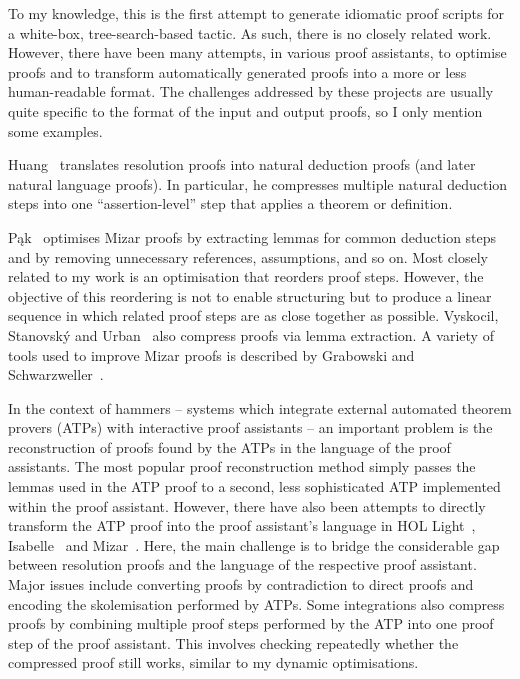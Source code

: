 \documentclass[sigplan,10pt,anonymous,review]{acmart}
\begin{document}
To my knowledge, this is the first attempt to generate idiomatic proof scripts for a white-box, tree-search-based tactic.
As such, there is no closely related work.
However, there have been many attempts, in various proof assistants, to optimise proofs and to transform automatically generated proofs into a more or less human-readable format.
The challenges addressed by these projects are usually quite specific to the format of the input and output proofs, so I only mention some examples.

Huang~\cite{Huang1989,Huang1994,Huang1996} translates resolution proofs into natural deduction proofs (and later natural language proofs).
In particular, he compresses multiple natural deduction steps into one \enquote{assertion-level} step that applies a theorem or definition.

Pąk~\cite{Pak2015,Pak2014a,Pak2014b,Pak2013,Pak2010} optimises Mizar proofs by extracting lemmas for common deduction steps and by removing unnecessary references, assumptions, and so on.
Most closely related to my work is an optimisation that reorders proof steps.
However, the objective of this reordering is not to enable structuring but to produce a linear sequence in which related proof steps are as close together as possible.
Vyskocil, Stanovský and Urban~\cite{Vyskovil2010} also compress proofs via lemma extraction.
A variety of tools used to improve Mizar proofs is described by Grabowski and Schwarzweller~\cite{Grabowski2009}.

In the context of hammers -- systems which integrate external automated theorem provers (ATPs) with interactive proof assistants -- an important problem is the reconstruction of proofs found by the ATPs in the language of the proof assistants.
The most popular proof reconstruction method simply passes the lemmas used in the ATP proof to a second, less sophisticated ATP implemented within the proof assistant.
However, there have also been attempts to directly transform the ATP proof into the proof assistant's language in HOL Light~\cite{PRocH}, Isabelle~\cite{Paulson2007,Blanchette2013a,Blanchette2013b,Blanchette2016} and Mizar~\cite{ATPMizar,MizarATP}.
Here, the main challenge is to bridge the considerable gap between resolution proofs and the language of the respective proof assistant.
Major issues include converting proofs by contradiction to direct proofs and encoding the skolemisation performed by ATPs.
Some integrations also compress proofs by combining multiple proof steps performed by the ATP into one proof step of the proof assistant.
This involves checking repeatedly whether the compressed proof still works, similar to my dynamic optimisations.
\end{document}
